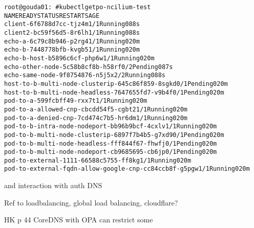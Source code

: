 \documentclass[Screen16to9,17pt]{foils}
\begin{document}
\begin{alltt}
root@gouda01:~# kubectl get po -n cilium-test
NAME                                                    READY   STATUS    RESTARTS   AGE
client-6f6788d7cc-tjz4m                                 1/1     Running   0          88s
client2-bc59f56d5-8r6lh                                 1/1     Running   0          88s
echo-a-6c79c8b946-p2rg4                                 1/1     Running   0          20m
echo-b-7448778bfb-kvgb5                                 1/1     Running   0          20m
echo-b-host-b5896c6cf-php6w                             1/1     Running   0          20m
echo-other-node-5c58b8cf8b-h58rf                        0/2     Pending   0          87s
echo-same-node-9f8754876-n5j5x                          2/2     Running   0          88s
host-to-b-multi-node-clusterip-645c86f859-8sgkd         0/1     Pending   0          20m
host-to-b-multi-node-headless-7647655fd7-v9b4f          0/1     Pending   0          20m
pod-to-a-599fcbff49-rxx7t                               1/1     Running   0          20m
pod-to-a-allowed-cnp-cbcdd54f5-cgbt2                    1/1     Running   0          20m
pod-to-a-denied-cnp-7cd474c7b5-hr6dm                    1/1     Running   0          20m
pod-to-b-intra-node-nodeport-bb96b9bcf-4cxlv            1/1     Running   0          20m
pod-to-b-multi-node-clusterip-6897f7b4b5-g7xd9          0/1     Pending   0          20m
pod-to-b-multi-node-headless-fff844f67-fhwfj            0/1     Pending   0          20m
pod-to-b-multi-node-nodeport-cb9685695-cb6jp            0/1     Pending   0          20m
pod-to-external-1111-66588c5755-ff8kg                   1/1     Running   0          20m
pod-to-external-fqdn-allow-google-cnp-cc84ccb8f-g5pgw   1/1     Running   0          20m
\end{alltt}


\begin{list2}
\item and interaction with auth DNS
\end{list2}

Ref to loadbalancing, global load balancing, cloudflare?

HK p 44 CoreDNS with OPA can restrict some


\begin{list2}
\item
\end{list2}
\end{document}
